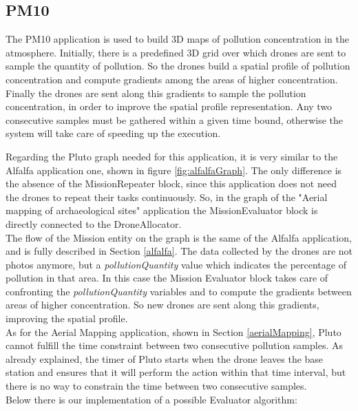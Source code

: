 \subsection{PM10}

The PM10\cite{pm10} application is used to build 3D maps of pollution concentration in the atmosphere. 
Initially, there is a predefined 3D grid over which drones are sent to sample the quantity of pollution.
So the drones build a spatial profile of pollution concentration and compute gradients among the areas of higher concentration.
Finally the drones are sent along this gradients to sample the pollution concentration, in order to improve the spatial profile representation.
Any two consecutive samples must be gathered within a given time bound, otherwise the system will take care of speeding up the execution.

Regarding the Pluto graph needed for this application, it is very similar to the Alfalfa\cite{alfalfa} application one, shown in figure \ref{fig:alfalfaGraph}.
The only difference is the absence of the MissionRepeater block, since this application does not need the drones to repeat their tasks continuously.
So, in the graph of the "Aerial mapping of archaeological sites" application the MissionEvaluator block is directly connected to the DroneAllocator.
\\

The flow of the Mission entity on the graph is the same of the Alfalfa\cite{alfalfa} application, and is fully described in Section \ref{alfalfa}.
The data collected by the drones are not photos anymore, but a \textit{pollutionQuantity} value which indicates the percentage of pollution in that area.
In this case the Mission Evaluator block takes care of confronting the \textit{pollutionQuantity} variables and to compute the gradients between areas of higher concentration.
So new drones are sent along this gradients, improving the spatial profile.
\\


As for the Aerial Mapping application, shown in Section \ref{aerialMapping}, Pluto cannot fulfill the time constraint between two consecutive pollution samples.
As already explained, the timer of Pluto starts when the drone leaves the base station and ensures that it will perform the action within that time interval, but there is no way to constrain the time between two consecutive samples.
\\


Below there is our implementation of a possible Evaluator algorithm:
\\


